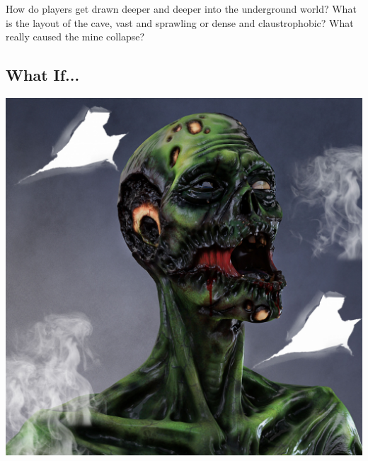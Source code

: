 \documentclass[landscape]{book}
\begin{document}
\begin{multicols*}{4}
How do players get drawn deeper and deeper into the underground world?
What is the layout of the cave, vast and sprawling or dense and claustrophobic?
What really caused the mine collapse?

\subsection*{What If...}

\includegraphics[width=\columnwidth]{./zombie}


\end{multicols*}
\end{document}
